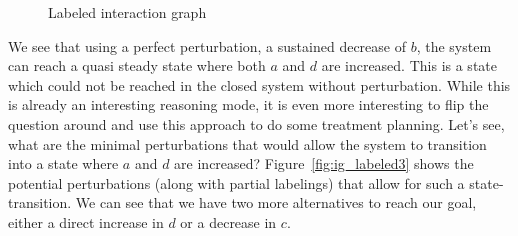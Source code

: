 \begin{figure}
\begin{center}
\end{center}
\caption{Labeled interaction graph}
\label{fig:ig_labeled2}
\end{figure}


We see that using a perfect perturbation, a sustained decrease of $b$,
 the system can reach a quasi steady state where both $a$ and $d$ are increased.
This is a state which could not be reached in the closed system without perturbation.
While this is already an interesting reasoning mode,
 it is even more interesting to flip the question around and use this approach to do some treatment planning.
Let's see, what are the minimal perturbations that would allow the system to transition 
 into a state where $a$ and $d$ are increased?
Figure~\ref{fig:ig_labeled3} shows the potential perturbations (along with partial labelings) that allow for such a state-transition.
We can see that we have two more alternatives to reach our goal, either a direct increase in $d$ or a decrease in $c$.
 
